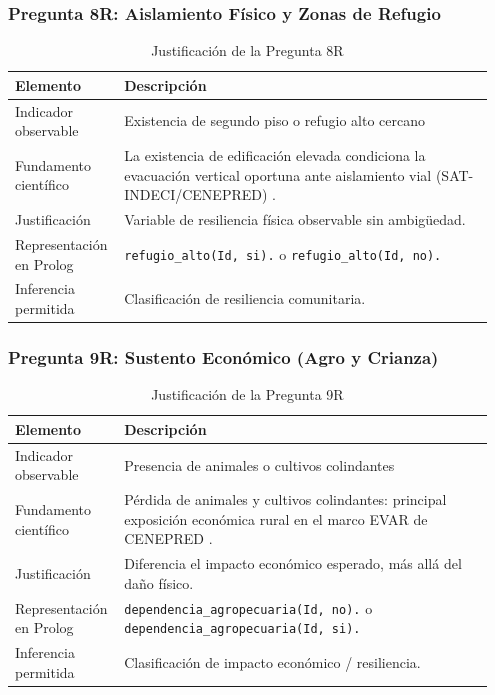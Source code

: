 \documentclass[12pt, letterpaper]{article}
\begin{document}
\subsubsection*{Pregunta 8R: Aislamiento Físico y Zonas de Refugio}
\begin{table}[H]
\centering
\caption{Justificación de la Pregunta 8R}
\label{tab:p8r}
\begin{tabular}{@{}p{0.2\linewidth}p{0.75\linewidth}@{}}
\toprule
\textbf{Elemento} & \textbf{Descripción} \\ \midrule
Indicador observable & Existencia de segundo piso o refugio alto cercano \\
Fundamento científico & La existencia de edificación elevada condiciona la evacuación vertical oportuna ante aislamiento vial (SAT-INDECI/CENEPRED) \parencite{cenepred_manual_evar}. \\
Justificación & Variable de resiliencia física observable sin ambigüedad. \\
Representación en Prolog & \texttt{refugio\_alto(Id, si).} o \texttt{refugio\_alto(Id, no).} \\
Inferencia permitida & Clasificación de resiliencia comunitaria. \\ \bottomrule
\end{tabular}
\end{table}

\subsubsection*{Pregunta 9R: Sustento Económico (Agro y Crianza)}
\begin{table}[H]
\centering
\caption{Justificación de la Pregunta 9R}
\label{tab:p9r}
\begin{tabular}{@{}p{0.2\linewidth}p{0.75\linewidth}@{}}
\toprule
\textbf{Elemento} & \textbf{Descripción} \\ \midrule
Indicador observable & Presencia de animales o cultivos colindantes \\
Fundamento científico & Pérdida de animales y cultivos colindantes: principal exposición económica rural en el marco EVAR de CENEPRED \parencite{cenepred_manual_evar}. \\
Justificación & Diferencia el impacto económico esperado, más allá del daño físico. \\
Representación en Prolog & \texttt{dependencia\_agropecuaria(Id, no).} o \texttt{dependencia\_agropecuaria(Id, si).} \\
Inferencia permitida & Clasificación de impacto económico / resiliencia. \\ \bottomrule
\end{tabular}
\end{table}
\end{document}
